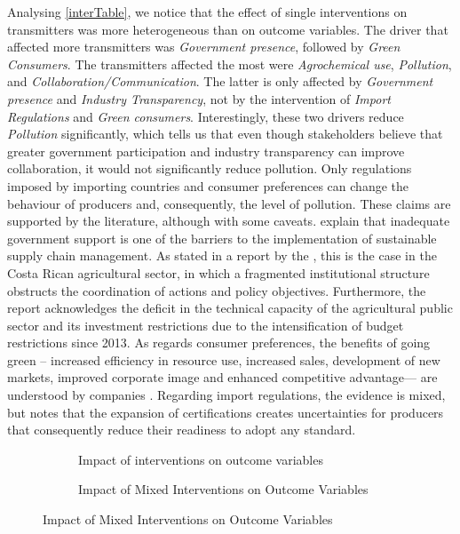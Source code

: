 Analysing \cref{interTable}, we notice that the effect of single interventions on transmitters was more heterogeneous than on outcome variables. The driver that affected more transmitters was \textit{Government presence}, followed by \textit{Green Consumers}. The transmitters affected the most were \textit{Agrochemical use}, \textit{Pollution}, and \textit{Collaboration/Communication}. The latter is only affected by \textit{Government presence} and \textit{Industry Transparency}, not by the intervention of \textit{Import Regulations} and \textit{Green consumers}. Interestingly, these two drivers reduce \textit{Pollution} significantly, which tells us that even though stakeholders believe that greater government participation and industry transparency can improve collaboration, it would not significantly reduce pollution. Only regulations imposed by importing countries and consumer preferences can change the behaviour of producers and, consequently, the level of pollution. These claims are supported by the literature, although with some caveats. \cite{sajjad2015sustainable} explain that inadequate government support is one of the barriers to the implementation of sustainable supply chain management. As stated in a report by the \cite{oecd2017oecd}, this is the case in the Costa Rican agricultural sector, in which a fragmented 
institutional structure obstructs the coordination of actions and policy objectives. Furthermore, the report acknowledges the deficit in the technical capacity of the agricultural public sector and its investment restrictions due to the intensification of budget restrictions since 2013. As regards consumer preferences, the benefits of going green -- increased efficiency in resource use, increased sales, development of new markets, improved corporate image and enhanced competitive advantage--- are understood by companies \citep{dangelico2010mainstreaming}. Regarding import regulations, the evidence is mixed, but \cite{montiel2019effect} notes that the expansion of certifications creates uncertainties for producers that consequently reduce their readiness to adopt any standard.

\begin{figure}[h]
\caption{Impact of (mixed) interventions on outcome variables} \label{interBars}
\begin{subfigure}[b]{0.45\textwidth}
  \centering
  
\caption{Impact of interventions on outcome variables} 
  \label{interventionBar}
\end{subfigure}%
  \hfill
\begin{subfigure}[b]{0.45\textwidth}
  \centering
  
\caption{Impact of Mixed Interventions on Outcome Variables}    
  \label{mixedBar}
\end{subfigure}
\end{figure}

